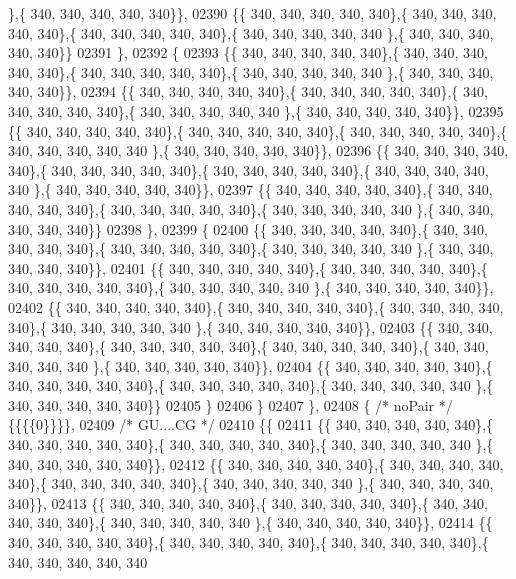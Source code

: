 \begin{DoxyCode}
      \},\{ 340, 340, 340, 340, 340\}\},
02390 \{\{ 340, 340, 340, 340, 340\},\{ 340, 340, 340, 340, 340\},\{ 340, 340, 340, 340, 340\},\{ 340, 340, 340, 340, 340
      \},\{ 340, 340, 340, 340, 340\}\}
02391 \},
02392 \{
02393 \{\{ 340, 340, 340, 340, 340\},\{ 340, 340, 340, 340, 340\},\{ 340, 340, 340, 340, 340\},\{ 340, 340, 340, 340, 340
      \},\{ 340, 340, 340, 340, 340\}\},
02394 \{\{ 340, 340, 340, 340, 340\},\{ 340, 340, 340, 340, 340\},\{ 340, 340, 340, 340, 340\},\{ 340, 340, 340, 340, 340
      \},\{ 340, 340, 340, 340, 340\}\},
02395 \{\{ 340, 340, 340, 340, 340\},\{ 340, 340, 340, 340, 340\},\{ 340, 340, 340, 340, 340\},\{ 340, 340, 340, 340, 340
      \},\{ 340, 340, 340, 340, 340\}\},
02396 \{\{ 340, 340, 340, 340, 340\},\{ 340, 340, 340, 340, 340\},\{ 340, 340, 340, 340, 340\},\{ 340, 340, 340, 340, 340
      \},\{ 340, 340, 340, 340, 340\}\},
02397 \{\{ 340, 340, 340, 340, 340\},\{ 340, 340, 340, 340, 340\},\{ 340, 340, 340, 340, 340\},\{ 340, 340, 340, 340, 340
      \},\{ 340, 340, 340, 340, 340\}\}
02398 \},
02399 \{
02400 \{\{ 340, 340, 340, 340, 340\},\{ 340, 340, 340, 340, 340\},\{ 340, 340, 340, 340, 340\},\{ 340, 340, 340, 340, 340
      \},\{ 340, 340, 340, 340, 340\}\},
02401 \{\{ 340, 340, 340, 340, 340\},\{ 340, 340, 340, 340, 340\},\{ 340, 340, 340, 340, 340\},\{ 340, 340, 340, 340, 340
      \},\{ 340, 340, 340, 340, 340\}\},
02402 \{\{ 340, 340, 340, 340, 340\},\{ 340, 340, 340, 340, 340\},\{ 340, 340, 340, 340, 340\},\{ 340, 340, 340, 340, 340
      \},\{ 340, 340, 340, 340, 340\}\},
02403 \{\{ 340, 340, 340, 340, 340\},\{ 340, 340, 340, 340, 340\},\{ 340, 340, 340, 340, 340\},\{ 340, 340, 340, 340, 340
      \},\{ 340, 340, 340, 340, 340\}\},
02404 \{\{ 340, 340, 340, 340, 340\},\{ 340, 340, 340, 340, 340\},\{ 340, 340, 340, 340, 340\},\{ 340, 340, 340, 340, 340
      \},\{ 340, 340, 340, 340, 340\}\}
02405 \}
02406 \}
02407 \},
02408 \{ \textcolor{comment}{/* noPair */} \{\{\{\{0\}\}\}\},
02409 \textcolor{comment}{/* GU....CG */}
02410 \{\{
02411 \{\{ 340, 340, 340, 340, 340\},\{ 340, 340, 340, 340, 340\},\{ 340, 340, 340, 340, 340\},\{ 340, 340, 340, 340, 340
      \},\{ 340, 340, 340, 340, 340\}\},
02412 \{\{ 340, 340, 340, 340, 340\},\{ 340, 340, 340, 340, 340\},\{ 340, 340, 340, 340, 340\},\{ 340, 340, 340, 340, 340
      \},\{ 340, 340, 340, 340, 340\}\},
02413 \{\{ 340, 340, 340, 340, 340\},\{ 340, 340, 340, 340, 340\},\{ 340, 340, 340, 340, 340\},\{ 340, 340, 340, 340, 340
      \},\{ 340, 340, 340, 340, 340\}\},
02414 \{\{ 340, 340, 340, 340, 340\},\{ 340, 340, 340, 340, 340\},\{ 340, 340, 340, 340, 340\},\{ 340, 340, 340, 340, 340

\end{DoxyCode}
